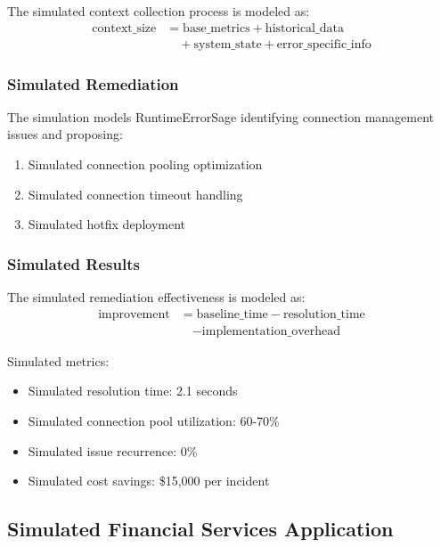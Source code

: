 The simulated context collection process is modeled as:
\begin{equation}
\begin{split}
\text{context\_size} &= \text{base\_metrics} + \text{historical\_data} \\
&\quad + \text{system\_state} + \text{error\_specific\_info}
\end{split}
\end{equation}

\subsubsection{Simulated Remediation}
The simulation models RuntimeErrorSage identifying connection management issues and proposing:
\begin{enumerate}
    \item Simulated connection pooling optimization
    \item Simulated connection timeout handling
    \item Simulated hotfix deployment
\end{enumerate}

\subsubsection{Simulated Results}
The simulated remediation effectiveness is modeled as:
\begin{equation}
\begin{split}
\text{improvement} &= \text{baseline\_time} - \text{resolution\_time} \\
&\quad - \text{implementation\_overhead}
\end{split}
\end{equation}

Simulated metrics:
\begin{itemize}
    \item Simulated resolution time: 2.1 seconds
    \item Simulated connection pool utilization: 60-70\%
    \item Simulated issue recurrence: 0\%
    \item Simulated cost savings: \$15,000 per incident
\end{itemize}

\subsection{Simulated Financial Services Application}

